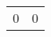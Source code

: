 \documentclass[../NormediProgetto.tex]{subfiles}
\begin{document}
	\begin{table}[H]
		\begin{tabular}{l | l}
		0 & 0\\
	\end{tabular}
\end{table}
\end{document}
